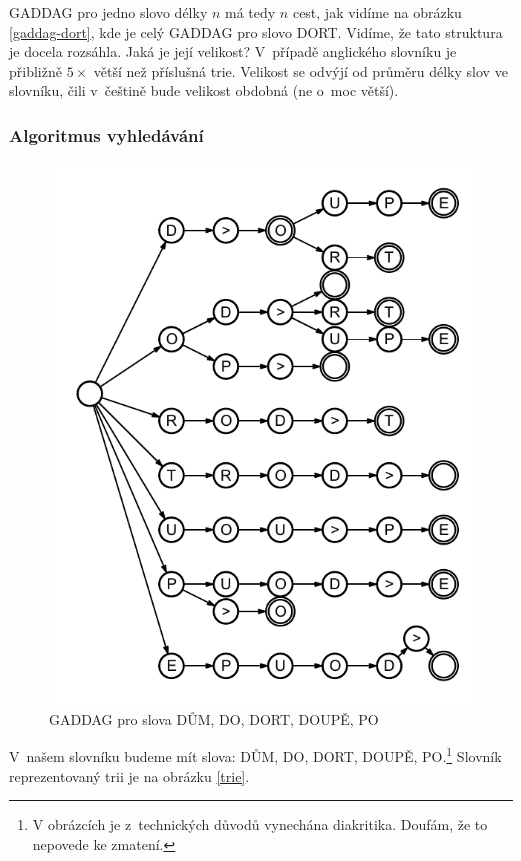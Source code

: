 \documentclass[a4paper]{article}
\begin{document}
GADDAG pro jedno slovo délky $n$ má tedy $n$ cest, jak vidíme na obrázku \ref{gaddag-dort}, kde je celý GADDAG pro slovo DORT. Vidíme, že tato struktura je docela rozsáhla. Jaká je její velikost? V~případě anglického slovníku je přibližně $5\times$ větší než příslušná trie. Velikost se odvýjí od průměru délky slov ve slovníku, čili v~češtině bude velikost obdobná (ne o~moc větší).

\subsubsection{Algoritmus vyhledávání}
\begin{figure}[hb]
\centering
\includegraphics{pic/gaddag-all.pdf}
\caption{GADDAG pro slova DŮM, DO, DORT, DOUPĚ, PO}
\label{gaddag-all}
\end{figure}
V~našem slovníku budeme mít slova: DŮM, DO, DORT, DOUPĚ, PO.\footnote{V obrázcích je z~technických důvodů vynechána diakritika. Doufám, že to nepovede ke zmatení.} Slovník reprezentovaný trii je na obrázku \ref{trie}.
\end{document}
